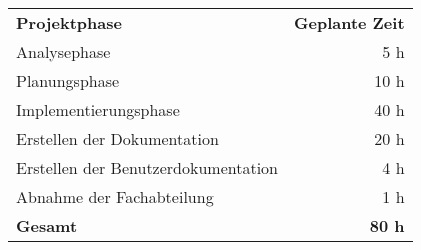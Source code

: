 \begin{tabular}{lr}
\rowcolor{heading}\textbf{Projektphase} & \textbf{Geplante Zeit} \\
Analysephase & 5 h \\
\rowcolor{odd}Planungsphase & 10 h \\
Implementierungsphase & 40 h \\
\rowcolor{odd}Erstellen der Dokumentation & 20 h \\
Erstellen der Benutzerdokumentation & 4 h \\
\rowcolor{odd}Abnahme der Fachabteilung & 1 h \\
\hline
\hline
\rowcolor{odd}\textbf{Gesamt} & \textbf{80 h} \\
\end{tabular}

